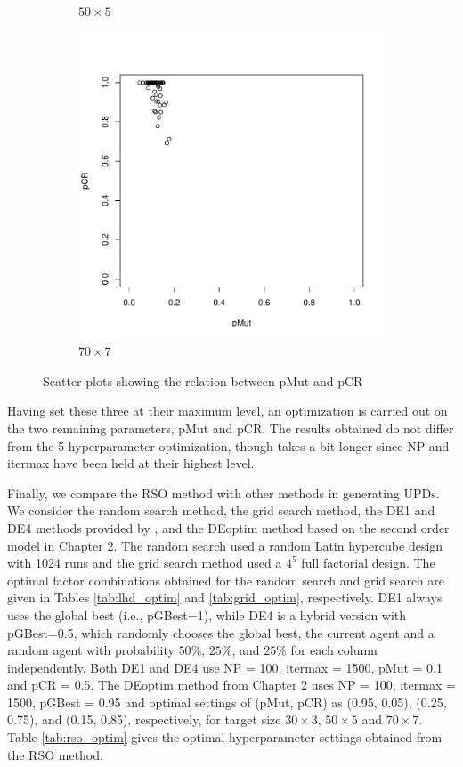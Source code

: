 \documentclass [PhD] {package/uclathes}
\begin{document}
\begin{figure}
\begin{subfigure}[b]{0.3\textwidth}
\caption{$50\times 5$}
\end{subfigure}
\begin{subfigure}[b]{0.3\textwidth}
\includegraphics{chapters/RSO/pdfs/scatter70}
\caption{$70\times 7$}
\end{subfigure}
\caption{Scatter plots showing the relation between pMut and pCR}
\label{fig:scatter}
\end{figure}

Having set these three at their maximum level, an optimization is carried out on the two remaining parameters, pMut and pCR. The results obtained do not differ from the 5 hyperparameter optimization, though takes a bit longer since NP and itermax have been held at their highest level.

{Finally, we compare the RSO method with other methods in generating UPDs.
We consider the random search method, the grid search method, the DE1 and DE4 methods provided by \textcite{stokes2023metaheuristic}, and the DEoptim method based on the second order model in Chapter 2. The random search used a random Latin hypercube design with 1024 runs and the grid search method used a $4^5$ full factorial design. The optimal factor combinations obtained for the random search and grid search are given in Tables \ref{tab:lhd_optim} and \ref{tab:grid_optim}, respectively.}
DE1 always uses the global best (i.e., pGBest=1), while DE4 is a hybrid version with pGBest=0.5, which randomly chooses the global best, the current agent and a random agent with probability $50$\%, $25$\%, and $25$\% for each column independently. Both DE1 and DE4 use NP = 100, itermax = 1500, pMut = 0.1 and pCR = 0.5.  The DEoptim method from Chapter 2 uses  NP = 100, itermax = 1500, pGBest = 0.95 and optimal settings of (pMut, pCR) as (0.95, 0.05), (0.25, 0.75), and (0.15, 0.85), respectively, for target size $30\times3$, $50\times5$ and $70\times7$. {Table \ref{tab:rso_optim} gives the optimal hyperparameter settings obtained from  the RSO method.}
\end{document}
